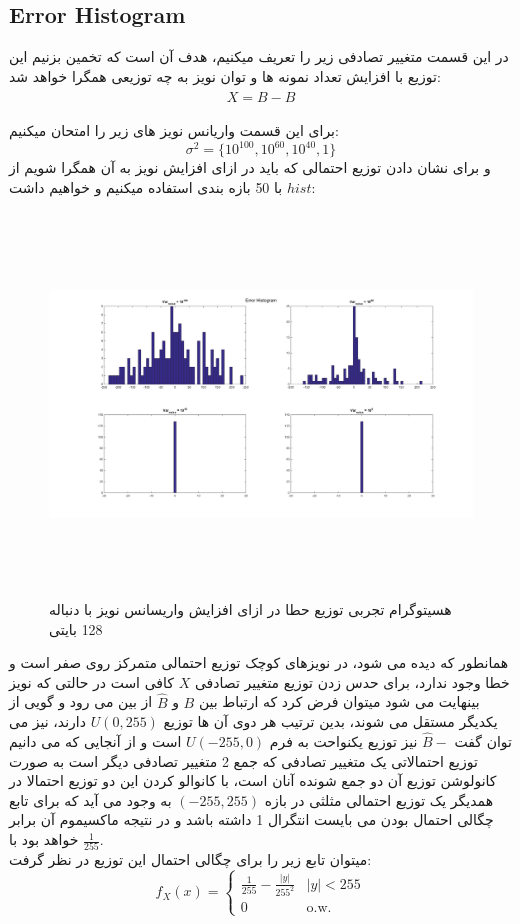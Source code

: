 \documentclass[a4paper,12pt]{article}
\begin{document}
\subsection{Error Histogram}
در این قسمت متغییر تصادفی زیر را تعریف میکنیم، هدف آن است که تخمین بزنیم این توزیع با افزایش تعداد نمونه ها و توان نویز به چه توزیعی همگرا خواهد شد:
$$
X = B - \hat{B}
$$
\\
برای این قسمت واریانس نویز های زیر را امتحان میکنیم:
$$
\sigma^2 = \{10^{100}, 10^{60}, 10^{40}, 1\}
$$
و برای نشان دادن توزیع احتمالی که باید در ازای افزایش نویز به آن همگرا شویم از $hist$ با 50 بازه بندی استفاده میکنیم و خواهیم داشت:
\begin{figure}[htbp]
\centerline{\includegraphics[width=6.625in, height=4in]{../4.8bitTransferring/Q3_128Byte.png}}
\caption{هسیتوگرام تجربی توزیع حطا در ازای افزایش واریسانس نویز با دنباله 128 بایتی}
\label{fig}
\end{figure}
همانطور که دیده می شود، در نویزهای کوچک توزیع احتمالی متمرکز روی صفر است و خطا وجود ندارد، برای حدس زدن توزیع متغییر تصادفی $X$ کافی است در حالتی که نویز بینهایت می شود میتوان فرض کرد که ارتباط بین $B$ و $\hat{B}$ از بین می رود و گویی از یکدیگر مستقل می شوند، بدین ترتیب هر دوی آن ها توزیع $U(0,255)$ دارند، نیز می توان گفت $\hat{B}-$ نیز توزیع یکنواحت به فرم  $U(-255,0)$ است و از آنجایی که می دانیم توزیع احتمالاتی یک متغییر تصادفی که جمع 2 متغییر تصادفی دیگر است به صورت کانولوشن توزیع آن دو جمع شونده آنان است، با کانوالو کردن این دو توزیع احتمالا در همدیگر یک توزیع احتمالی مثلثی در بازه $(-255, 255)$ به وجود می آید که برای تابع چگالی احتمال بودن می بایست انتگرال 1 داشته باشد و در نتیجه ماکسیموم آن برابر خواهد بود با $\frac{1}{255}$.
\\
میتوان تابع زیر را برای چگالی احتمال این توزیع در نظر گرفت:
$$
f_X(x)=\left\{
    \begin{array}{ll}
         \frac{1}{255} - \frac{|y|}{255^2} & |y| < 255 \\
        0 & \mbox{o.w.}
    \end{array}
\right.
$$
\end{document}

